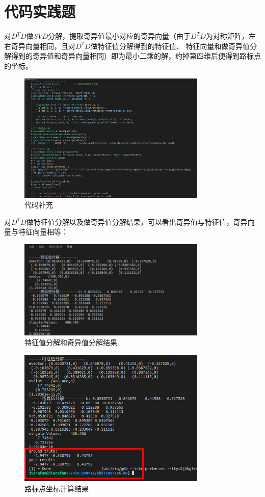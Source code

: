 \documentclass[UTF8]{ctexart}
\begin{document}
\section{代码实践题}
\indent 对$D^TD$做$SVD$分解，提取奇异值最小对应的奇异向量（由于$D^TD$为对称矩阵，左右奇异向量相同，且对$D^TD$做特征值分解得到的特征值、
特征向量和做奇异值分解得到的奇异值和奇异向量相同）即为最小二乘的解，约掉第四维后便得到路标点的坐标。\\
\begin{figure}[H]
\centering
\includegraphics[width=0.8\textwidth]{1.1.jpg}    
\caption{代码补充}
\label{img0}
\end{figure}
\indent  对$D^TD$做特征值分解以及做奇异值分解结果，可以看出奇异值与特征值，奇异向量与特征向量相等：
\begin{figure}[H]
\centering
\includegraphics[width=0.8\textwidth]{1.2.jpg}    
\caption{特征值分解和奇异值分解结果}
\label{img0}
\end{figure}
\begin{figure}[H]
\centering
\includegraphics[width=0.8\textwidth]{1.3.jpg}    
\caption{路标点坐标计算结果}
\label{img0}
\end{figure}
\end{document}
